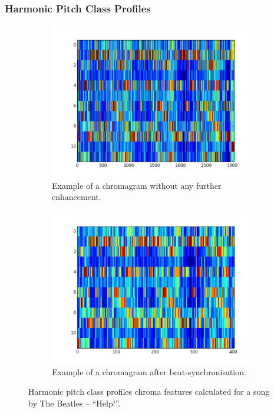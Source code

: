 \subsubsection*{Harmonic Pitch Class Profiles}

\begin{figure}
        \centering
        \begin{subfigure}{0.47\textwidth}
                \includegraphics[width=\textwidth]{Figures/hpcp_unsynched_chroma}
                \caption{Example of a chromagram without any further enhancement. }
                \label{fig:unchroma}
        \end{subfigure}
        \begin{subfigure}{0.47\textwidth}
                \includegraphics[width=\textwidth]{Figures/hpcp_synched_chroma}
                \caption{Example of a chromagram after beat-synchronisation.}
                \label{fig:synchroma}
        \end{subfigure}
          \caption{Harmonic pitch class profiles chroma features calculated for a song by The Beatles -- ``Help!''.}
        \label{fig:chromacomparison}
\end{figure}

